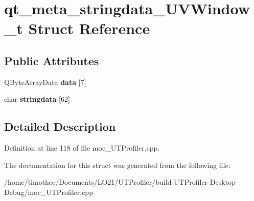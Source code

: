 \hypertarget{structqt__meta__stringdata___u_v_window__t}{\section{qt\-\_\-meta\-\_\-stringdata\-\_\-\-U\-V\-Window\-\_\-t Struct Reference}
\label{structqt__meta__stringdata___u_v_window__t}
}
\subsection*{Public Attributes}
\begin{DoxyCompactItemize}
\item 
\hypertarget{structqt__meta__stringdata___u_v_window__t_a8d6f241a1a98c720b3ec974889a66bb7}{Q\-Byte\-Array\-Data {\bfseries data} \mbox{[}7\mbox{]}}\label{structqt__meta__stringdata___u_v_window__t_a8d6f241a1a98c720b3ec974889a66bb7}

\item 
\hypertarget{structqt__meta__stringdata___u_v_window__t_aea165668963a3225679b8f30692af0ba}{char {\bfseries stringdata} \mbox{[}62\mbox{]}}\label{structqt__meta__stringdata___u_v_window__t_aea165668963a3225679b8f30692af0ba}

\end{DoxyCompactItemize}


\subsection{Detailed Description}


Definition at line 118 of file moc\-\_\-\-U\-T\-Profiler.\-cpp.



The documentation for this struct was generated from the following file\-:\begin{DoxyCompactItemize}
\item 
/home/timothee/\-Documents/\-L\-O21/\-U\-T\-Profiler/build-\/\-U\-T\-Profiler-\/\-Desktop-\/\-Debug/moc\-\_\-\-U\-T\-Profiler.\-cpp\end{DoxyCompactItemize}

